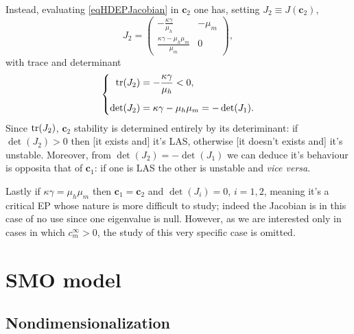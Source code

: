                 Instead, evaluating \eqref{eqHDEPJacobian} in $\mathbf c_2$ one has, setting $J_2\equiv J(\mathbf c_2)$,
                \begin{equation}
                    J_2=
                    \begin{pmatrix}
                        -\frac{\kappa\gamma}{\mu_h}&-\mu_m\\
                        \frac{\kappa\gamma-\mu_h\mu_m}{\mu_m}&0
                    \end{pmatrix},
                    \label{eqHDc2Jacobian}
                \end{equation}
                with trace and determinant
                \begin{equation}
                    \left\{
                    \begin{aligned}
                        \operatorname{tr}(J_2)&=-\frac{\kappa\gamma}{\mu_h}<0,\\[5pt]
                        \det(J_2)&=\kappa\gamma-\mu_h\mu_m=-\det(J_1).
                    \end{aligned}
                    \right.
                    \label{eqHDc2TraceDet}
                \end{equation}
                Since $\operatorname{tr}(J_2)$, $\mathbf c_2$ stability is determined entirely by its deteriminant: if $\det(J_2)>0$ then [it exists and] it's LAS, otherwise [it doesn't exists and] it's unstable. Moreover, from $\det(J_2)=-\det(J_1)$ we can deduce it's behaviour is opposita that of $\mathbf c_1$: if one is LAS the other is unstable and \textit{vice versa}.

                Lastly if $\kappa\gamma=\mu_h\mu_m$ then $\mathbf c_1=\mathbf c_2$ and $\det(J_i)=0$, $i=1,2$, meaning it's a critical EP \cite{NLDCStrogatz2024} whose nature is more difficult to study; indeed the Jacobian is in this case of no use since one eigenvalue is null. However, as we are interested only in cases in which $c_m^\infty>0$, the study of this very specific case is omitted.

        \section{SMO model}\label{apxSMOModel}

            \subsection{Nondimensionalization}\label{apxContinuousModelsNondimensionalization}

